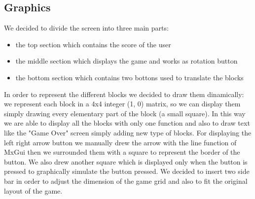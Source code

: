 	\subsection{Graphics}
		We decided to divide the screen into three main parts:
		\begin{itemize}
			\item the top section which contains the score of the user
			\item the middle section which displays the game and works as rotation button
			\item the bottom section which contains two bottons used to translate the blocks
		\end{itemize} 
		In order to represent the different blocks we decided to draw them dinamically: we represent each block in a 4x4 integer (1, 0) matrix, so we can 
		display them simply drawing every elementary part of the block (a small square).
		In this way we are able to display all the blocks with only one function and also to draw text like the "Game Over" screen simply adding new type of blocks.
		For displaying the left right arrow button we manually drew the arrow with the line function of MxGui then we surrounded them with a square to represent the border of the button.
		We also drew another square which is displayed only when the button is pressed to graphically simulate the button pressed.
		We decided to insert two side bar in order to adjust the dimension of the game grid and also to fit the original layout of the game.
	